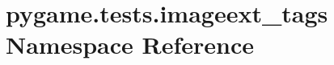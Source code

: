 \hypertarget{namespacepygame_1_1tests_1_1imageext__tags}{}\section{pygame.\+tests.\+imageext\+\_\+tags Namespace Reference}
\label{namespacepygame_1_1tests_1_1imageext__tags}
